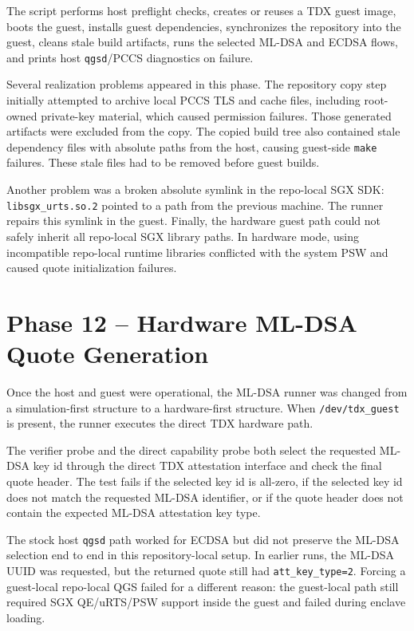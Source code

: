 The script performs host preflight checks, creates or reuses a TDX guest image,
boots the guest, installs guest dependencies, synchronizes the repository into
the guest, cleans stale build artifacts, runs the selected ML-DSA and ECDSA
flows, and prints host \texttt{qgsd}/PCCS diagnostics on failure.

Several realization problems appeared in this phase. The repository copy step
initially attempted to archive local PCCS TLS and cache files, including
root-owned private-key material, which caused permission failures. Those
generated artifacts were excluded from the copy. The copied build tree also
contained stale dependency files with absolute paths from the host, causing
guest-side \texttt{make} failures. These stale files had to be removed before
guest builds.

Another problem was a broken absolute symlink in the repo-local SGX SDK:
\texttt{libsgx\_urts.so.2} pointed to a path from the previous machine. The
runner repairs this symlink in the guest. Finally, the hardware guest path
could not safely inherit all repo-local SGX library paths. In hardware mode,
using incompatible repo-local runtime libraries conflicted with the system PSW
and caused quote initialization failures.

\section{Phase 12 -- Hardware ML-DSA Quote Generation}

Once the host and guest were operational, the ML-DSA runner was changed from a
simulation-first structure to a hardware-first structure. When
\texttt{/dev/tdx\_guest} is present, the runner executes the direct TDX
hardware path.

The verifier probe and the direct capability probe both select the requested
ML-DSA key id through the direct TDX attestation interface and check the final
quote header. The test fails if the selected key id is all-zero, if the
selected key id does not match the requested ML-DSA identifier, or if the quote
header does not contain the expected ML-DSA attestation key type.

The stock host \texttt{qgsd} path worked for ECDSA but did not preserve the
ML-DSA selection end to end in this repository-local setup. In earlier runs,
the ML-DSA UUID was requested, but the returned quote still had
\texttt{att\_key\_type=2}. Forcing a guest-local repo-local QGS failed for a
different reason: the guest-local path still required SGX QE/uRTS/PSW support
inside the guest and failed during enclave loading.

